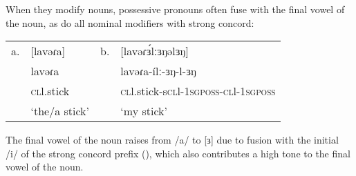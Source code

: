 When they modify nouns, possessive pronouns often fuse with the final vowel of the noun, as do all nominal modifiers with strong concord:

\ea
\begin{tabular}[t]{llll}
a. & [lavəɾa]  		& b. & 	[lavəɾɜ́lːɜŋəlɜŋ]\\
	& lavəɾa 	  	&	& lavəɾa-ílː-ɜŋ-l-ɜŋ\\
	& \textsc{cl}l.stick 	& 	& 	\textsc{cl}l.stick-s\textsc{cl}l-1\textsc{sgposs}-\textsc{cl}l-1\textsc{sgposs}\\
	& ‘the/a stick’ & 	&	‘my stick’	\\
\end{tabular}
\z 
The final vowel of the noun raises from /a/ to [ɜ] due to fusion with the initial /i/ of the strong concord prefix (), which also contributes a high tone to the final vowel of the noun.

%
%

